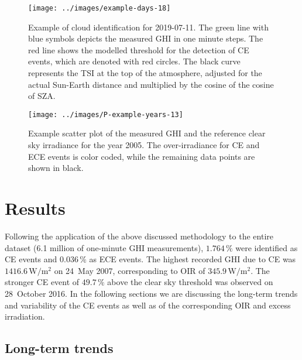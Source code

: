 \documentclass[preprint, 5p,
authoryear]{elsarticle} %
\begin{document}
\begin{figure}[H]

{\centering \texttt{[image: ../images/example-days-18]} 

}

\caption{Example of cloud identification for 2019-07-11. The green line with blue symbols depicts the measured GHI in one minute steps. The red line shows the modelled threshold for the detection of CE events, which are denoted with red circles. The black curve represents the TSI at the top of the atmosphere, adjusted for the actual Sun-Earth distance and multiplied by the cosine of the cosine of SZA.}\label{fig:example-day}
\end{figure}

\begin{figure}[H]

{\centering \texttt{[image: ../images/P-example-years-13]} 

}

\caption{Example scatter plot of the measured GHI and the reference clear sky irradiance for the year 2005. The over-irradiance for CE and ECE events is color coded, while the remaining data points are shown in black.}\label{fig:example-year}
\end{figure}

\hypertarget{results}{%
\section{Results}\label{results}}

Following the application of the above discussed methodology to the
entire dataset (6.1 million of one-minute GHI measurements),
\(1.764\,\%\) were identified as CE events and \(0.036\,\%\) as ECE
events. The highest recorded GHI due to CE was
\(1416.6\,\text{W}/\text{m}^2\) on 24~May 2007, corresponding to OIR of
\(345.9\,\text{W}/\text{m}^2\). The stronger CE event of \(49.7\,\%\)
above the clear sky threshold was observed on 28~October 2016. In the
following sections we are discussing the long-term trends and
variability of the CE events as well as of the corresponding OIR and
excess irradiation.

\hypertarget{long-term-trends}{%
\subsection{Long-term trends}\label{long-term-trends}}
\end{document}
